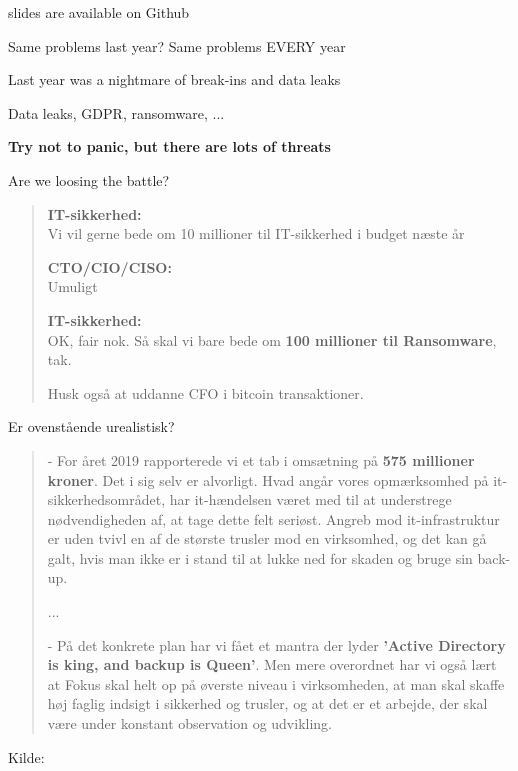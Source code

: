 \documentclass[Screen16to9,17pt]{foils}
\begin{document}


\vskip 1cm
\centerline{\footnotesize slides are available on Github}




\begin{list2}
\item Same problems last year? Same problems EVERY year
\item Last year was a nightmare of break-ins and data leaks
\item Data leaks, GDPR, ransomware, ...
\end{list2}

\vskip 1cm
{\LARGE\bf Try not to panic, but there are lots of threats}

Are we loosing the battle?



\begin{quote}\large
{\bf IT-sikkerhed:}\\
Vi vil gerne bede om 10 millioner til IT-sikkerhed i budget næste år

{\bf CTO/CIO/CISO:}\\
Umuligt

{\bf IT-sikkerhed:}\\
OK, fair nok. Så skal vi bare bede om {\bf 100 millioner til Ransomware}, tak.

Husk også at uddanne CFO i bitcoin transaktioner.
\end{quote}

\begin{list2}
\item Er ovenstående urealistisk?
\end{list2}



\begin{quote}
- For året 2019 rapporterede vi et tab i omsætning på {\bf 575 millioner kroner}. Det i sig selv er alvorligt. Hvad angår vores opmærksomhed på it-sikkerhedsområdet, har it-hændelsen været med til at understrege nødvendigheden af, at tage dette felt seriøst. Angreb mod it-infrastruktur er uden tvivl en af de største trusler mod en virksomhed, og det kan gå galt, hvis man ikke er i stand til at lukke ned for skaden og bruge sin back-up.

...

- På det konkrete plan har vi fået et mantra der lyder {\bf ’Active Directory is king, and backup is Queen’}. Men mere overordnet har vi også lært at Fokus skal helt op på øverste niveau i virksomheden, at man skal skaffe høj faglig indsigt i sikkerhed og trusler, og at det er et arbejde, der skal være under konstant observation og udvikling.

\end{quote}
Kilde: 
\end{document}
